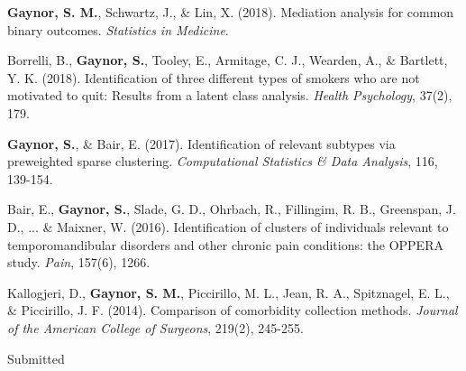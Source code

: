 

\begin{cvpapers}

\cvpaper
    {\textbf{Gaynor, S. M.}, Schwartz, J., \& Lin, X. (2018). Mediation analysis for common binary outcomes. \textit{Statistics in Medicine}.} %
    {} %
    { } %
    {} %
    
    \cvpaper
    {Borrelli, B., \textbf{Gaynor, S.}, Tooley, E., Armitage, C. J., Wearden, A., \& Bartlett, Y. K. (2018). Identification of three different types of smokers who are not motivated to quit: Results from a latent class analysis. \textit{Health Psychology}, 37(2), 179.} %
    {} %
    { } %
    {} %
    
    
  \cvpaper
    {\textbf{Gaynor, S.}, \& Bair, E. (2017). Identification of relevant subtypes via preweighted sparse clustering. \textit{Computational Statistics \& Data Analysis}, 116, 139-154.} %
    {} %
    { } %
    {} %
    
 \cvpaper
    {Bair, E., \textbf{Gaynor, S.}, Slade, G. D., Ohrbach, R., Fillingim, R. B., Greenspan, J. D., ... \& Maixner, W. (2016). Identification of clusters of individuals relevant to temporomandibular disorders and other chronic pain conditions: the OPPERA study. \textit{Pain}, 157(6), 1266.} %
    {} %
    { } %
    {} %
    
 \cvpaper
    {Kallogjeri, D., \textbf{Gaynor, S. M.}, Piccirillo, M. L., Jean, R. A., Spitznagel, E. L., \& Piccirillo, J. F. (2014). Comparison of comorbidity collection methods. \textit{Journal of the American College of Surgeons}, 219(2), 245-255.} %
    {} %
    { } %
    {} %
    

\end{cvpapers}

Submitted

